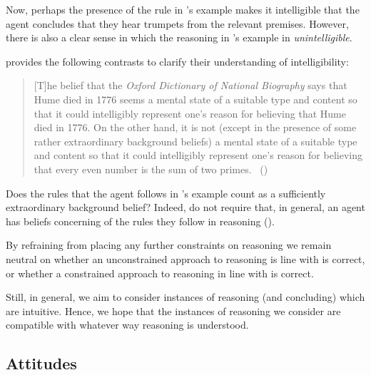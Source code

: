 \begin{note}[No constraints]
  Now, perhaps the presence of the rule in \citeauthor{Broome:2013aa}'s example makes it intelligible that the agent concludes that they hear trumpets from the relevant premises.
  However, there is also a clear sense in which the reasoning in \citeauthor{Broome:2013aa}'s example in \emph{unintelligible}.

  \citeauthor{Wedgwood:2006ui} provides the following contrasts to clarify their understanding of intelligibility:

  \begin{quote}
    [T]he belief that the \emph{Oxford Dictionary of National Biography} says that Hume died in 1776 seems a mental state of a suitable type and content so that it could intelligibly represent one's reason for believing that Hume died in 1776.
    On the other hand, it is not (except in the presence of some rather extraordinary background beliefs) a mental state of a suitable type and content so that it could intelligibly represent one's reason for believing that every even number is the sum of two primes.%
    \mbox{ }\hfill\mbox{(\citeyear[662]{Wedgwood:2006ui})}
  \end{quote}

  Does the rules that the agent follows in \citeauthor{Broome:2013aa}'s example count as a sufficiently extraordinary background belief?
  Indeed, \citeauthor{Broome:2013aa} do not require that, in general, an agent has beliefs concerning of the rules they follow in reasoning (\citeyear[Cf.][\S13.2]{Broome:2013aa}).
\end{note}

\begin{note}
  By refraining from placing any further constraints on reasoning we remain neutral on whether an unconstrained approach to reasoning is line with \citeauthor{Broome:2013aa} is correct, or whether a constrained approach to reasoning in line with \citeauthor{Wedgwood:2006ui} is correct.

  Still, in general, we aim to consider instances of reasoning (and concluding) which are intuitive.
  Hence, we hope that the instances of reasoning we consider are compatible with whatever way reasoning is understood.
\end{note}

\subsection{Attitudes}

